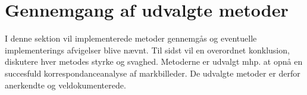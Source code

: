 \chapter{Gennemgang af udvalgte metoder}\label{sec:detmet}
I denne sektion vil implementerede metoder gennemgås og eventuelle implementerings afvigelser blive nævnt. Til sidst vil en overordnet konklusion, diskutere hver metodes styrke og svaghed. Metoderne er udvalgt mhp. at opnå en succesfuld korrespondanceanalyse af markbilleder. De udvalgte metoder er derfor anerkendte og veldokumenterede.





